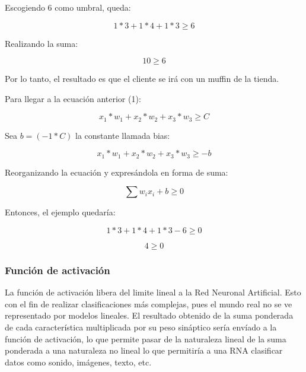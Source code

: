 \documentclass[journal]{IEEEtai}
\begin{document}
Escogiendo 6 como umbral, queda:

\begin{equation}
	1 * 3 + 1 * 4 + 1 * 3 \geq 6
\end{equation}

Realizando la suma:

\begin{equation}
	10 \geq 6
\end{equation}

Por lo tanto, el resultado es que el cliente se irá con un muffin de la tienda.

Para llegar a la ecuación anterior (1):

\begin{equation}
	x_{1} * w_{1}+ x_{2} * w_{2} + x_{3} * w_{3} \geq C
\end{equation}

Sea $b = (-1 * C)$ la constante llamada bias:

\begin{equation}
	x_{1} * w_{1}+ x_{2} * w_{2} + x_{3} * w_{3} \geq -b
\end{equation}

Reorganizando la ecuación y expresándola en forma de suma:

\begin{equation}
	\sum{w_{i}x_{i}} + b \geq 0
\end{equation}

Entonces, el ejemplo quedaría:

\begin{equation}
	1 * 3 + 1 * 4 + 1 * 3 - 6 \geq0
\end{equation}

\begin{equation}
	4 \geq 0
\end{equation}

\subsubsection{Función de activación}

La función de activación libera del limite lineal a la Red Neuronal Artificial. Esto con el fin de realizar clasificaciones más complejas, pues el mundo real no se ve representado por modelos lineales. El resultado obtenido de la suma ponderada de cada característica multiplicada por su peso sináptico sería envíado a la función de activación, lo que permite pasar de la naturaleza lineal de la suma ponderada a una naturaleza no lineal lo que permitiría a una RNA clasificar datos como sonido, imágenes, texto, etc.
\end{document}
